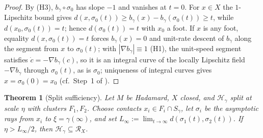 \documentclass[11pt]{article}
\newtheorem{theorem}{Theorem}[section]
\theoremstyle{remark}
\newcommand{\X}{X}
\newcommand{\Rx}{\mathcal{R}_{\X}}
\newcommand{\Hb}[1]{\mathcal{H}_{#1}}
\newcommand{\Sb}[1]{S_{#1}}
\begin{document}
\begin{proof}
By (H3), $b_{\gamma}\circ\sigma_{0}$ has slope $-1$ and vanishes at
$t=0$. For $x\in\X$ the $1$-Lipschitz bound gives
$d(x,\sigma_{0}(t))\ge b_{\gamma}(x)-b_{\gamma}(\sigma_{0}(t))\ge t$,
while $d(x_{0},\sigma_{0}(t))=t$; hence $d(\sigma_{0}(t))=t$ with
$x_{0}$ a foot. If $x$ is any foot, equality
$d(x,\sigma_{0}(t))=t$ forces $b_{\gamma}(x)=0$ and unit-rate descent
of $b_{\gamma}$ along the segment from $x$ to $\sigma_{0}(t)$; with
$|\nabla b_{\gamma}|\equiv1$ (H1), the unit-speed segment satisfies
$\dot c=-\nabla b_{\gamma}(c)$, so it is an integral curve of the
locally Lipschitz field $-\nabla b_{\gamma}$ through
$\sigma_{0}(t)$, as is $\sigma_{0}$; uniqueness of integral curves
gives $x=\sigma_{0}(0)=x_{0}$ (cf.\ Step~1 of \cite[Thm.~4.1]{R1}).
\end{proof}

\begin{theorem}[Split sufficiency]\label{thm:split}
Let $M$ be Hadamard, $\X$ closed, and $\Hb{\gamma}$ split at scale
$\eta$ with clusters $F_{1},F_{2}$. Choose contacts
$x_{i}\in F_{i}\cap \Sb{\gamma}$, let $\sigma_{i}$ be the asymptotic
rays from $x_{i}$ to $\xi=\gamma(\infty)$, and set
$L_{\infty}:=\lim_{t\to\infty}d(\sigma_{1}(t),\sigma_{2}(t))$. If
$\eta>L_{\infty}/2$, then $\Hb{\gamma}\subseteq\Rx$.
\end{theorem}
\end{document}

